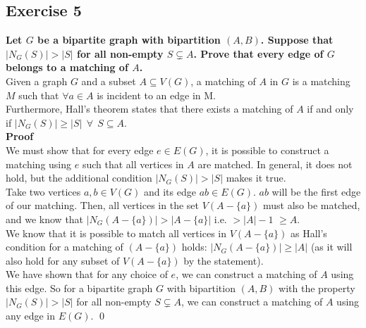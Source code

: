 \subsection*{Exercise 5}
\boldmath
\textbf{Let $G$ be a bipartite graph with bipartition $(A, B)$. Suppose that $|N_G(S)| > |S|$ for all non-empty
$S \subsetneq A$. Prove that every edge of $G$ belongs to a matching of $A$.} \\
\unboldmath
\linebreak
Given a graph $G$ and a subset $A \subseteq V(G)$, a matching of $A$ in $G$ is a matching $M$ such that $\forall a \in A$ is incident to an edge in M. \\
\linebreak 
Furthermore, Hall's theorem states that there exists a matching of $A$ if and only if $|N_G(S)| \geq |S| \:\: \forall \:\: S \subseteq A$. \\
\linebreak 
\textbf{Proof} \\
We must show that for every edge $e \in E(G)$, it is possible to construct a matching using $e$ such that all vertices in $A$ are matched. In general, it does not hold, but the additional condition $|N_G(S)| > |S|$ makes it true. \\
\linebreak 
Take two vertices $a, b \in V(G)$ and its edge $ab \in E(G)$. $ab$ will be the first edge of our matching. Then, all vertices in the set $V(A - \{a\})$ must also be matched, and we know that $|N_G(A-\{a\})| > |A-\{a\}|$ i.e. $ > |A| - 1$ $\geq A$. \\
\linebreak 
We know that it is possible to match all vertices in $V(A - \{a\})$ as Hall's condition for a matching of $(A - \{a\})$ holds: $|N_G(A-\{a\})| \geq |A|$ (as it will also hold for any subset of $V(A-\{a\})$ by the statement). \\
\linebreak 
We have shown that for any choice of $e$, we can construct a matching of $A$ using this edge. So for a bipartite graph $G$ with bipartition $(A, B)$ with the property $|N_G(S)| > |S|$ for all non-empty
$S \subsetneq A$, we can construct a matching of $A$ using any edge in $E(G)$. \qed